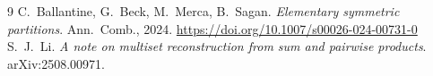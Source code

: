 \documentclass[11pt]{article}
\theoremstyle{remark}
\begin{document}
\begin{thebibliography}{9}
 C.~Ballantine, G.~Beck, M.~Merca, B.~Sagan. \emph{Elementary symmetric partitions}. Ann.\ Comb., 2024. \url{https://doi.org/10.1007/s00026-024-00731-0}
 S.~J.~Li. \emph{A note on multiset reconstruction from sum and pairwise products}. arXiv:2508.00971.
\end{thebibliography}
\end{document}
